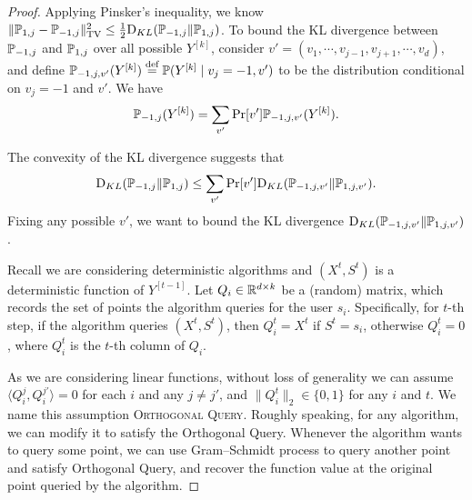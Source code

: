 \begin{proof}
Applying Pinsker's inequality, we know $\|\mathbb P_{1,j}-\mathbb P_{-1,j}\|_{\mathrm{TV}}^2\leq \frac{1}{2}\mathrm{D}_{KL}(\mathbb P_{-1,j}\|\mathbb P_{1,j})$.
To bound the KL divergence between $\mathbb P_{-1,j}$ and $\mathbb P_{1,j}$ over all possible $Y^{[k]}$, consider $v'=(v_1,\cdots,v_{j-1},v_{j+1},\cdots,v_d)$, and define $\mathbb P_{-1,j,v'}(Y^{[k]})\stackrel{{\text{def}}}{=} \mathbb P(Y^{[k]}\mid v_j=-1,v')$ to be the distribution conditional on $v_j=-1$ and $v'$.
We have
\begin{align*}
    \mathbb P_{-1,j}(Y^{[k]})= \sum_{v'}\Pr[v']\mathbb P_{-1,j,v'}(Y^{[k]}).
\end{align*}

The convexity of the KL divergence suggests that
\begin{align*}
    \mathrm{D}_{KL}(\mathbb P_{-1,j}\|\mathbb P_{1,j})\leq \sum_{v'}\Pr[v']\mathrm{D}_{KL}(\mathbb P_{-1,j,v'}\|\mathbb P_{1,j,v'}).
\end{align*}
Fixing any possible $v'$, we want to bound the KL divergence $\mathrm{D}_{KL}(\mathbb P_{-1,j,v'}\|\mathbb P_{1,j,v'})$.

Recall we are considering deterministic algorithms and
$(X^t,S^t)$ is a deterministic function of $Y^{[t-1]}$.
Let $Q_i\in \mathbb{R}^{d\times k}$ be a (random) matrix, which records the set of points the algorithm queries for the user $s_i$.
Specifically, for $t$-th step, if the algorithm queries $(X^t,S^t)$, then $Q_{i}^{t}=X^t$ if $S^t=s_i$, otherwise $Q_{i}^{t}=0$, where $Q_i^t$ is the $t$-th column of $Q_i$.

As we are considering linear functions, without loss of generality we can assume  $\langle Q_{i}^j,Q_{i}^{j'}\rangle=0$ for each $i$ and any $j\neq j'$, and $\|Q_{i}^t\|_2\in\{0,1\}$ for any $i$ and $t$.
We name this assumption \textsc{Orthogonal Query}.
Roughly speaking, for any algorithm, we can modify it to satisfy the Orthogonal Query.
Whenever the algorithm wants to query some point, we can use Gram–Schmidt process to query another point and satisfy Orthogonal Query, and recover the function value at the original point queried by the algorithm.


\end{proof}
